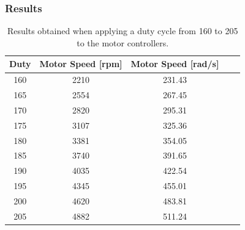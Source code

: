 \subsubsection{Results}
\begin{table}[H]
	\centering
	\begin{tabular}{|c|c|c|c|c|}
		\hline%
		\textbf{Duty}    & \textbf{Motor Speed [rpm]} & \textbf{Motor Speed [rad/s]} \\ 
		\hline%
		160                & 2210         	   &  231.43                                       \\
		\hline%
		 165      &  2554 						       &  267.45				                \\
		\hline%
         170      &  2820 						       &  295.31				                \\
         \hline%
         175       &  3107                               &  325.36   			                  \\
        \hline%
		 180       &  3381                               &  354.05   			                  \\
		\hline%
		185    & 3740                               &  391.65  			                       \\
		\hline%
		190   &    4035                               &  422.54                                \\
		\hline%
		195   &  4345 						       &  455.01				                   \\
		\hline%
		200 &  4620                               &  483.81    			                    \\
		\hline%
		 205   &    4882                               &  511.24                               \\
		\hline%
	\end{tabular}
	\caption{Results obtained when applying a duty cycle from 160 to 205 to the motor controllers.}
\end{table}

